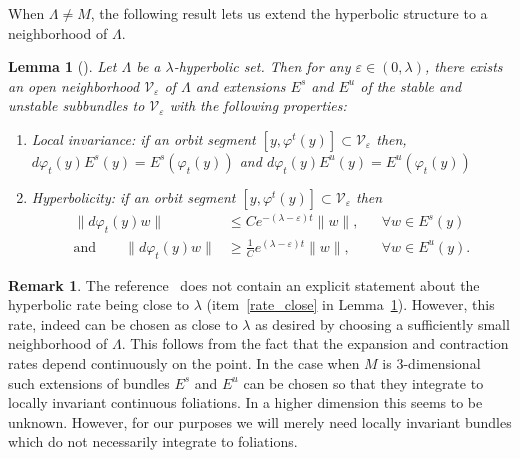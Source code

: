 \documentclass[10pt]{amsart}
\newtheorem{lemma}[theorem]{Lemma}
\theoremstyle{definition}
\newtheorem{remark}[theorem]{Remark}
\let\phi\varphi
\let\eps\varepsilon
\renewcommand{\>}{{\rangle}}
\newcommand{\<}{{\langle}}
\begin{document}
When $\Lambda\neq M$, the following result lets us extend the hyperbolic structure to a neighborhood of $\Lambda$.
\begin{lemma}[\cite{HPPS70}]\label{lem: loc_hyp}
Let $\Lambda$ be a $\lambda$-hyperbolic set. Then for any $\eps\in (0,\lambda)$,
there exists an open neighborhood $\mathcal V_\eps$ of $\Lambda$ and extensions $E^s$ and $E^u$ of the stable and unstable subbundles to $\mathcal V_\eps$ with the following properties:
\begin{enumerate}
\item\label{loc_inv} Local invariance: if an orbit segment $[y, \phi^t(y)]\subset \mathcal V_\eps$ then, $d\phi_t(y)E^s(y)=E^s(\phi_t(y))$ and $d\phi_t(y)E^u(y)=E^u(\phi_t(y))$
\item\label{rate_close} Hyperbolicity: if an orbit segment $[y, \phi^t(y)]\subset \mathcal V_\eps$ then
\[
\begin{aligned}
\|d\phi_t(y)w\|&\leq Ce^{-(\lambda-\eps)t}\|w\|, && \forall w\in E^s(y)\\
\text{and} \qquad\|d\phi_t(y)w\|&\geq \frac 1Ce^{(\lambda-\eps)t}\|w\|, && \forall w\in E^u(y).
\end{aligned}
\]
\end{enumerate}
\end{lemma}

\begin{remark}
The reference~\cite{HPPS70} does not contain an explicit statement about the hyperbolic rate being close to $\lambda$ (item~\eqref{rate_close} in Lemma~\ref{lem: loc_hyp}). However, this rate, indeed can be chosen as close to $\lambda$ as desired by choosing a sufficiently small neighborhood of $\Lambda$. This follows from the fact that the expansion and contraction rates depend continuously on the point. In the case when $M$ is 3-dimensional such extensions of bundles $E^s$ and $E^u$ can be chosen so that they integrate to locally invariant continuous foliations. In a higher dimension this seems to be unknown. However, for our purposes we will merely need locally invariant bundles which do not necessarily integrate to foliations.
\end{remark}
\end{document}
